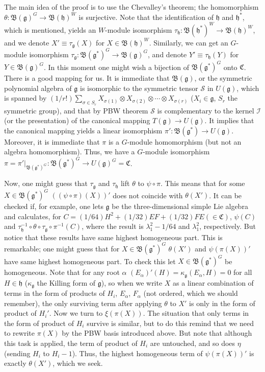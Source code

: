 \documentclass{article}
\newcommand{\lie}[1]{\mathfrak{#1}}
\begin{document}
The main idea of the proof is to use the Chevalley's theorem; the homomorphism $\theta : \mathfrak{B}(\lie{g})^G \to \mathfrak{B}(\lie{h})^W$ is surjective.
Note that the identification of $\lie{h}$ and $\lie{h}^*$, which is mentioned, yields an $W$-module isomorphism $\tau_\lie{h} : \mathfrak{B}(\lie{h}^*)^W \to \mathfrak{B}(\lie{h})^W$, and we denote $X' \equiv \tau_\lie{g}(X)$ for $X \in \mathfrak{B}(\lie{h})^W$.
Similarly, we can get an $G$-module isomorphism $\tau_\lie{g} : \mathfrak{B}(\lie{g}^*)^G \to \mathfrak{B}(\lie{g})^G$, and denote $Y' \equiv \tau_\lie{h}(Y)$ for $Y \in \mathfrak{B}(\lie{g})^G$.
In this moment one might wish a bijection of $\mathfrak{B}(\lie{g}^*)^G$ onto $\mathfrak{C}$.
There is a good mapping for us.
It is immediate that $\mathfrak{B}(\lie{g})$, or the symmetric polynomial algebra of $\lie{g}$ is isomorphic to the symmetric tensor $\mathcal{S}$ in $U(\lie{g})$, which is spanned by $(1/r!) \sum_{\sigma \in S_r} X_{\sigma(1)} \otimes X_{\sigma(2)} \otimes \cdots \otimes X_{\sigma(r)}$ ($X_i \in \lie{g}$, $S_r$ the symmetric group), and that by PBW theorem $\mathcal{S}$ is complementary to the kernel $\mathcal{I}$ (or the presentation) of the canonical mapping $T(\lie{g}) \to U(\lie{g})$.
It implies that the canonical mapping yields a linear isomorphism $\pi' : \mathfrak{B}(\lie{g}^*) \to U(\lie{g})$.
Moreover, it is immediate that $\pi$ is a $G$-module homomorphism (but not an algebra homomorphism).
Thus, we have a $G$-module isomorphism $\pi = \pi'|_{\mathfrak{B}(\lie{g}^*)^G} : \mathfrak{B}(\lie{g}^*)^G \to U(\lie{g})^G = \mathfrak{C}$.

Now, one might guess that $\tau_\lie{g}$ and $\tau_\lie{h}$ lift $\theta$ to $\psi \circ \pi$.
This means that for some $X \in \mathfrak{B}(\lie{g^*})^G$ $((\psi \circ \pi)(X))'$ does not coincide with $\theta(X')$.
It can be checked if, for example, one lets $\lie{g}$ be the three-dimensional simple Lie algebra and calculates, for $C = (1/64)H^2 + (1/32)EF + (1/32)FE( \in \mathfrak{C})$, $\psi(C)$ and $\tau_\lie{h}^{-1} \circ \theta \circ \tau_\lie{g} \circ \pi^{-1}(C)$, where the result is $\lambda_1^2 - 1/64$ and $\lambda_1^2$, respectively.
But notice that these results have same highest homogeneous part.
This is remarkable; one might guess that for $X \in \mathfrak{B}(\lie{g^*})^G$ $\theta(X')$ and $\psi(\pi(X))'$ have same highest homogeneous part.
To check this let $X \in \mathfrak{B}(\lie{g}^*)^G$ be homogeneous.
Note that for any root $\alpha$ $(E_\alpha)'(H) = \kappa_\lie{g}(E_\alpha, H) = 0$ for all $H \in \lie{h}$ ($\kappa_\lie{g}$ the Killing form of $\lie{g}$), so when we write $X$ as a linear combination of terms in the form of products of $H_i$, $E_\alpha$, $F_\alpha$ (not ordered, which we should remember), the only surviving term after applying $\theta$ to $X'$ is only in the form of product of $H_i'$.
Now we turn to $\xi(\pi(X))$.
The situation that only terms in the form of product of $H_i$ survive is similar, but to do this remind that we need to rewrite $\pi(X)$ by the PBW basis introduced above.
But note that although this task is applied, the term of product of $H_i$ are untouched, and so does $\eta$ (sending $H_i$ to $H_i - 1$).
Thus, the highest homogeneous term of $\psi(\pi(X))'$ is exactly $\theta(X')$, which we seek.
\end{document}
